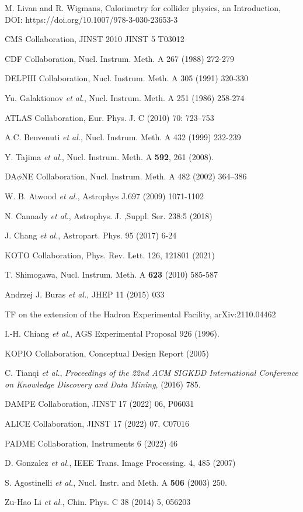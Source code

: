 \documentclass[12pt,times,draftclsnofoot,a4paper]{elsarticle}
\begin{document}
\begin{thebibliography}{99}
 
M. Livan and R. Wigmans, Calorimetry for collider physics, an Introduction, DOI: https://doi.org/10.1007/978-3-030-23653-3
 
CMS Collaboration, JINST 2010 JINST 5 T03012

CDF Collaboration, Nucl. Instrum. Meth. A 267 (1988) 272-279
 
DELPHI Collaboration, Nucl. Instrum. Meth. A 305 (1991) 320-330

Yu. Galaktionov {\it et al.}, Nucl. Instrum. Meth. A 251 (1986) 258-274

ATLAS Collaboration, Eur. Phys. J. C (2010) 70: 723–753

A.C. Benvenuti {\it et al.}, Nucl. Instrum. Meth. A 432 (1999) 232-239

Y. Tajima {\it et al.}, Nucl. Instrum. Meth. A {\bf 592}, 261 (2008).

DA$\phi$NE Collaboration, Nucl. Instrum. Meth. A 482 (2002) 364–386

W. B. Atwood {\it et al.}, Astrophys J.697 (2009) 1071-1102

N. Cannady {\it et al.}, Astrophys. J. ,Suppl. Ser. 238:5 (2018) 

J. Chang {\it et al.}, Astropart. Phys. 95 (2017) 6-24

KOTO Collaboration, Phys. Rev. Lett. 126, 121801 (2021)
 
T. Shimogawa, Nucl. Instrum. Meth. A {\bf 623} (2010) 585-587

Andrzej J. Buras {\it et al.}, JHEP 11 (2015) 033

TF on the extension of the Hadron Experimental Facility, arXiv:2110.04462

I.-H. Chiang {\it et al.}, AGS Experimental Proposal 926 (1996).

KOPIO Collaboration, Conceptual Design Report (2005)

C. Tianqi {\it et al.}, 
{\it Proceedings of the 22nd ACM SIGKDD International Conference on Knowledge Discovery and Data Mining},
(2016) 785.

DAMPE Collaboration, JINST 17 (2022) 06, P06031

ALICE Collaboration, JINST 17 (2022) 07, C07016

PADME Collaboration, Instruments 6 (2022) 46

D. Gonzalez {\it et al.}, IEEE Trans. Image Processing. 4, 485 (2007)

S. Agostinelli {\it et al.},  Nucl. Instr. and Meth. A {\bf 506} (2003) 250.

Zu-Hao Li {\it et al.}, Chin. Phys. C 38 (2014) 5, 056203

\end{thebibliography}
\end{document}
